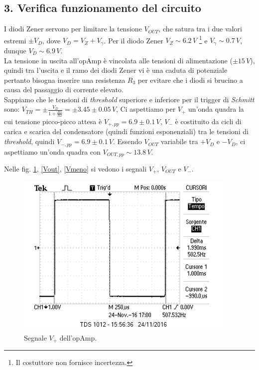 \documentclass[10pt,a4paper]{article}
\begin{document}
\subsection*{3. Verifica funzionamento del circuito}

I diodi Zener servono per limitare la tensione $V_{OUT}$, che satura tra i due valori estremi $\pm V_{D}$, dove $V_{D} = V_{Z} + V_{ \gamma}$. Per il diodo Zener $V_Z \sim 6.2 \, V$ \footnote{Il costuttore non fornisce incertezza.} e $V_{\gamma} \sim 0.7\, V$, dunque $V_D \sim 6.9 \, V$. \\
La tensione in uscita all'opAmp è vincolata alle tensioni di alimentazione ($\pm 15 \, V$), quindi tra l'uscita e il ramo dei diodi Zener vi è una caduta di potenziale pertanto bisogna inserire una resistenza $R_3$ per evitare che i diodi si brucino a causa del passaggio di corrente elevato. \\ 

Sappiamo che le tensioni di \emph{threshold} superiore e inferiore per il trigger di \emph{Schmitt} sono: $V_{TH} = \pm \frac{V_{D}}{1+\frac{R1}{R2}} = \pm 3.45 \pm 0.05 \, V$, 
Ci aspettiamo per $V_{+}$ un'onda quadra la cui tensione picco-picco attesa è $V_{+, pp} = 6.9 \pm 0.1 \, V$, $V_{-}$ è costituito da cicli di carica e scarica del condensatore (quindi funzioni esponenziali) tra le tensioni di \emph{threshold}, quindi $V_{-, pp} = 6.9 \pm 0.1 \, V$. Essendo $V_{OUT}$ variabile tra $+V_{D}$ e $-V_{D}$, ci aspettiamo un'onda quadra con $V_{OUT, pp} \sim 13.8 \, V$.

Nelle fig. \ref{Vpiu}, \ref{Vout}, \ref{Vmeno} si vedono i segnali $V_{+}$, $V_{OUT}$ e $V_{-}$.\\

\begin{figure}[htb!]
\centering
\includegraphics[scale=1.0]{immagini/multivibratoreVPIU.png}
\caption{Segnale $V_{+}$ dell'opAmp.}
\label{Vpiu}
\end{figure}
\end{document}
